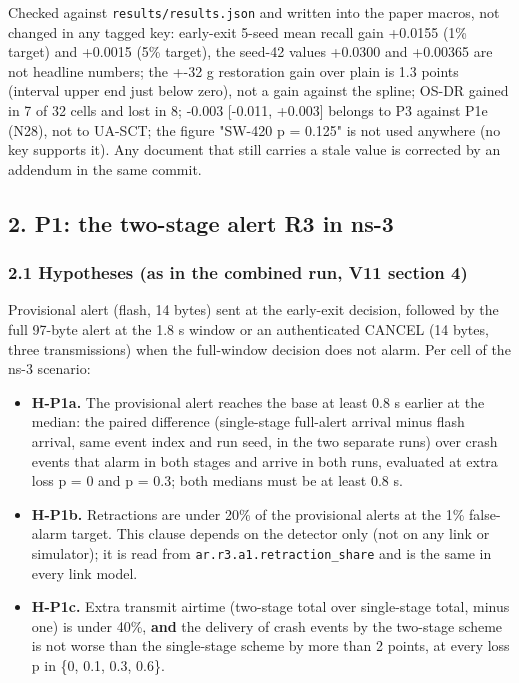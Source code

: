 Checked against \texttt{results/results.json} and written into the paper macros, not changed in any tagged key: early-exit 5-seed mean recall gain +0.0155 (1\% target) and +0.0015 (5\% target), the seed-42 values +0.0300 and +0.00365 are not headline numbers; the +-32 g restoration gain over plain is 1.3 points (interval upper end just below zero), not a gain against the spline; OS-DR gained in 7 of 32 cells and lost in 8; -0.003 [-0.011, +0.003] belongs to P3 against P1e (N28), not to UA-SCT; the figure "SW-420 p = 0.125" is not used anywhere (no key supports it). Any document that still carries a stale value is corrected by an addendum in the same commit.

\subsection*{2. P1: the two-stage alert R3 in ns-3}

\subsubsection*{2.1 Hypotheses (as in the combined run, V11 section 4)}

Provisional alert (flash, 14 bytes) sent at the early-exit decision, followed by the full 97-byte alert at the 1.8 s window or an authenticated CANCEL (14 bytes, three transmissions) when the full-window decision does not alarm. Per cell of the ns-3 scenario:

\begin{itemize}
\item \textbf{H-P1a.} The provisional alert reaches the base at least 0.8 s earlier at the median: the paired difference (single-stage full-alert arrival minus flash arrival, same event index and run seed, in the two separate runs) over crash events that alarm in both stages and arrive in both runs, evaluated at extra loss p = 0 and p = 0.3; both medians must be at least 0.8 s.
\item \textbf{H-P1b.} Retractions are under 20\% of the provisional alerts at the 1\% false-alarm target. This clause depends on the detector only (not on any link or simulator); it is read from \texttt{ar.r3.a1.retraction\_share} and is the same in every link model.
\item \textbf{H-P1c.} Extra transmit airtime (two-stage total over single-stage total, minus one) is under 40\%, \textbf{and} the delivery of crash events by the two-stage scheme is not worse than the single-stage scheme by more than 2 points, at every loss p in \{0, 0.1, 0.3, 0.6\}.
\end{itemize}

